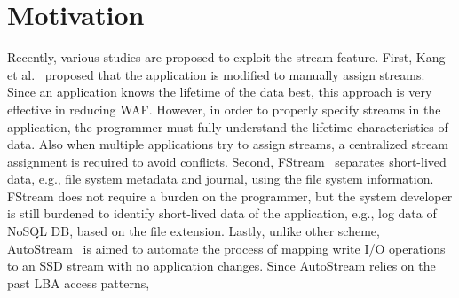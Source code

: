 \section{Motivation}
Recently, various studies are proposed to exploit the stream feature.
First, Kang et al.~\cite{MultiStream} proposed that the application
is modified to manually assign streams.
Since an application knows the lifetime of the data best, this approach
is very effective in reducing WAF.
However, in order to properly specify streams in the application, the programmer must
fully understand the lifetime characteristics of data.
Also when multiple applications try to assign streams, a centralized stream assignment
is required to avoid conflicts.
Second, FStream~\cite{FStream} separates short-lived data, e.g., file system metadata and
journal, using the file system information. 
FStream does not require a burden on the programmer, but the system developer is still burdened
to identify short-lived data of the application, e.g., log data of NoSQL DB, based on the file extension.
Lastly, unlike other scheme, AutoStream~\cite{AutoStream} is aimed to automate the process of mapping 
write I/O operations to an SSD stream with no application changes.
Since AutoStream relies on the past LBA access patterns, 

